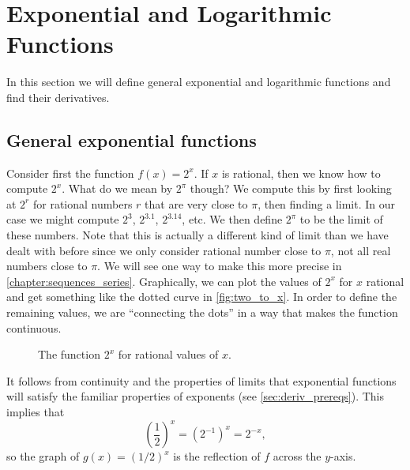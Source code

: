 \section{Exponential and Logarithmic Functions}\label{sec:exp_log}

In this section we will define general exponential and logarithmic functions and find their derivatives. 

\subsection*{General exponential functions}

Consider first the function $f(x)=2^x$. If $x$ is rational, then we know how to compute $2^x$. What do we mean by $2^\pi$ though? We compute this by first looking at $2^r$ for rational numbers $r$ that are very close to $\pi$, then finding a limit. In our case we might compute $2^3$, $2^{3.1}$, $2^{3.14}$, etc. We then define $2^\pi$ to be the limit of these numbers. Note that this is actually a different kind of limit than we have dealt with before since we only consider rational number close to $\pi$, not all real numbers close to $\pi$. We will see one way to make this more precise in \autoref{chapter:sequences_series}. Graphically, we can plot the values of $2^x$ for $x$ rational and get something like the dotted curve in \autoref{fig:two_to_x}. In order to define the remaining values, we are ``connecting the dots'' in a way that makes the function continuous.

\begin{figure}[h]
\begin{center}
\caption{The function $2^x$ for rational values of $x$.}\label{fig:two_to_x}
\end{center}
\end{figure}

It follows from continuity and the properties of limits that exponential functions will satisfy the familiar properties of exponents (see \autoref{sec:deriv_prereqs}).  This implies that
\[\left(\frac12\right)^x =(2^{-1})^x=2^{-x},\]
so the graph of $g(x)=(1/2)^x$ is the reflection of $f$ across the $y$-axis.

\begin{center}
\end{center}

